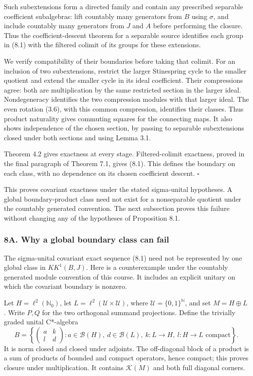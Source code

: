 \documentclass[
  11pt,
]{article}
\begin{document}
Such subextensions form a directed family and contain any prescribed
separable coefficient subalgebras: lift countably many generators from
\(B\) using \(\sigma\), and include countably many generators from \(J\)
and \(A\) before performing the closure. Thus the coefficient-descent
theorem for a separable source identifies each group in (8.1) with the
filtered colimit of its groups for these extensions.

We verify compatibility of their boundaries before taking that colimit.
For an inclusion of two subextensions, restrict the larger Stinespring
cycle to the smaller quotient and extend the smaller cycle in its ideal
coefficient. Their compressions agree: both are multiplication by the
same restricted section in the larger ideal. Nondegeneracy identifies
the two compression modules with that larger ideal. The even rotation
(3.6), with this common compression, identifies their classes. Thus
product naturality gives commuting squares for the connecting maps. It
also shows independence of the chosen section, by passing to separable
subextensions closed under both sections and using Lemma 3.1.

Theorem 4.2 gives exactness at every stage. Filtered-colimit exactness,
proved in the final paragraph of Theorem 7.1, gives (8.1). This defines
the boundary on each class, with no dependence on its chosen coefficient
descent. \(\square\)

This proves covariant exactness under the stated sigma-unital
hypotheses. A global boundary-product class need not exist for a
nonseparable quotient under the countably generated convention. The next
subsection proves this failure without changing any of the hypotheses of
Proposition 8.1.

\subsubsection{8A. Why a global boundary class can
fail}\label{a.-why-a-global-boundary-class-can-fail}

The sigma-unital covariant exact sequence (8.1) need not be represented
by one global class in \(KK^1(B,J)\). Here is a counterexample under the
countably generated module convention of this course. It includes an
explicit unitary on which the covariant boundary is nonzero.

Let \(H=\ell^2(\mathbb N_0)\), let
\(L=\ell^2(\mathcal U\times\mathcal U)\), where
\(\mathcal U=\{0,1\}^{\mathbb N}\), and set \(M=H\oplus L\). Write
\(P,Q\) for the two orthogonal summand projections. Define the trivially
graded unital C*-algebra \[
 B=\left\{
 \begin{pmatrix}a&k\\ l&d\end{pmatrix}:
 a\in\mathcal B(H),\ d\in\mathcal B(L),\
 k:L\to H,\ l:H\to L\text{ compact}
 \right\}.
 \tag{BC.1}
\] It is norm closed and closed under adjoints. The off-diagonal block
of a product is a sum of products of bounded and compact operators,
hence compact; this proves closure under multiplication. It contains
\(\mathcal K(M)\) and both full diagonal corners.
\end{document}
